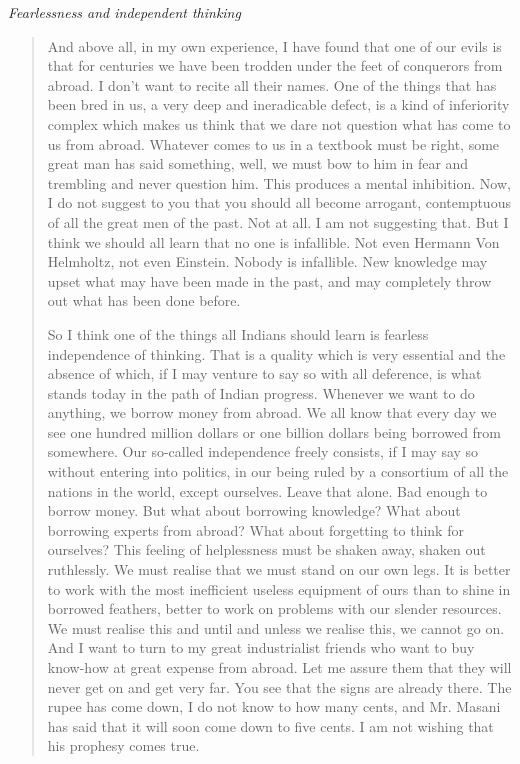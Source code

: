 \medskip
\noindent
{\em Fearlessness and independent thinking}
\begin{quote}
{\fontsize{10pt}{12pt}\selectfont
And above all, in my own experience, I have found that one of our evils is that for centuries we have been trodden under the feet of conquerors from abroad. I don't want to recite all their names. One of the things that has been bred in us, a very deep and ineradicable defect, is a kind of inferiority complex which makes us think that we dare not question what has come to us from abroad. Whatever comes to us in a textbook must be right, some great man has said something, well, we must bow to him in fear and trembling and never question him. This produces a mental inhibition. Now, I do not suggest to you that you should all become arrogant, contemptuous of all the great men of the past. Not at all. I am not suggesting that. But I think we should all learn that no one is infallible. Not even Hermann Von Helmholtz, not even Einstein. Nobody is infallible. New knowledge may upset what may have been made in the past, and may completely throw out what has been done before.

So I think one of the things all Indians should learn is fearless independence of thinking. That is a quality which is very essential and the absence of which, if I may venture to say so with all deference, is what stands today in the path of Indian progress. Whenever we want to do anything, we borrow money from abroad. We all know that every day we see one hundred million dollars or one billion dollars being borrowed from somewhere. Our so-called independence freely consists, if I may say so without entering into politics, in our being ruled by a consortium of all the nations in the world, except ourselves. Leave that alone. Bad enough to borrow money. But what about borrowing knowledge? What about borrowing experts from abroad? What about forgetting to think for ourselves? This feeling of helplessness must be shaken away, shaken out ruthlessly. We must realise that we must stand on our own legs. It is better to work with the most inefficient useless equipment of ours than to shine in borrowed feathers, better to work on problems with our slender resources. We must realise this and until and unless we realise this, we cannot go on. And I want to turn to my great industrialist friends who want to buy know-how at great expense from abroad. Let me assure them that they will never get on and get very far. You see that the signs are already there. The rupee has come down, I do not know to how many cents, and Mr. Masani has said that it will soon come down to five cents. I am not wishing that his prophesy comes true.
}\relax
\end{quote}

